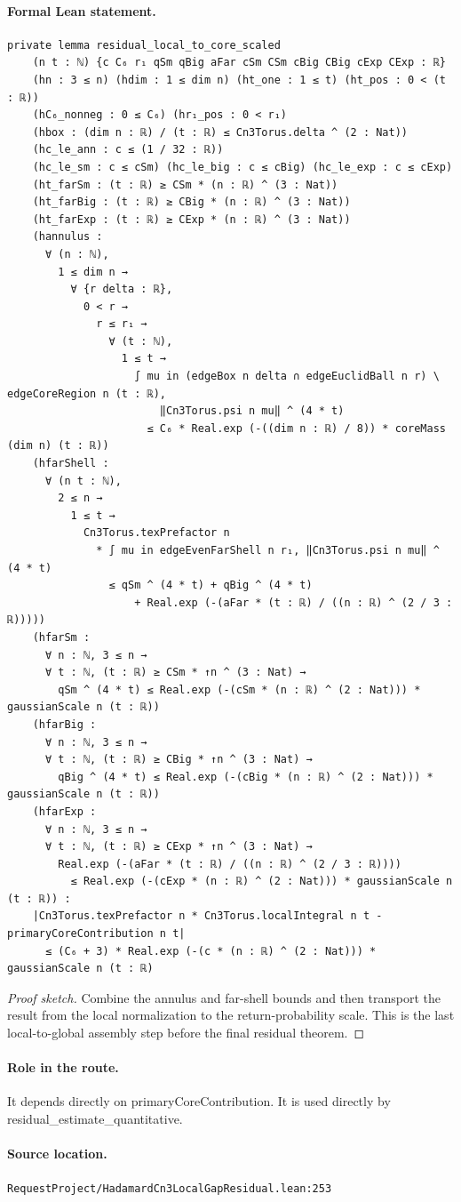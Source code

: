 \medskip
\paragraph{Formal Lean statement.}
\begin{verbatim}
private lemma residual_local_to_core_scaled
    (n t : ℕ) {c C₆ r₁ qSm qBig aFar cSm CSm cBig CBig cExp CExp : ℝ}
    (hn : 3 ≤ n) (hdim : 1 ≤ dim n) (ht_one : 1 ≤ t) (ht_pos : 0 < (t : ℝ))
    (hC₆_nonneg : 0 ≤ C₆) (hr₁_pos : 0 < r₁)
    (hbox : (dim n : ℝ) / (t : ℝ) ≤ Cn3Torus.delta ^ (2 : Nat))
    (hc_le_ann : c ≤ (1 / 32 : ℝ))
    (hc_le_sm : c ≤ cSm) (hc_le_big : c ≤ cBig) (hc_le_exp : c ≤ cExp)
    (ht_farSm : (t : ℝ) ≥ CSm * (n : ℝ) ^ (3 : Nat))
    (ht_farBig : (t : ℝ) ≥ CBig * (n : ℝ) ^ (3 : Nat))
    (ht_farExp : (t : ℝ) ≥ CExp * (n : ℝ) ^ (3 : Nat))
    (hannulus :
      ∀ (n : ℕ),
        1 ≤ dim n →
          ∀ {r delta : ℝ},
            0 < r →
              r ≤ r₁ →
                ∀ (t : ℕ),
                  1 ≤ t →
                    ∫ mu in (edgeBox n delta ∩ edgeEuclidBall n r) \ edgeCoreRegion n (t : ℝ),
                        ‖Cn3Torus.psi n mu‖ ^ (4 * t)
                      ≤ C₆ * Real.exp (-((dim n : ℝ) / 8)) * coreMass (dim n) (t : ℝ))
    (hfarShell :
      ∀ (n t : ℕ),
        2 ≤ n →
          1 ≤ t →
            Cn3Torus.texPrefactor n
              * ∫ mu in edgeEvenFarShell n r₁, ‖Cn3Torus.psi n mu‖ ^ (4 * t)
                ≤ qSm ^ (4 * t) + qBig ^ (4 * t)
                    + Real.exp (-(aFar * (t : ℝ) / ((n : ℝ) ^ (2 / 3 : ℝ)))))
    (hfarSm :
      ∀ n : ℕ, 3 ≤ n →
      ∀ t : ℕ, (t : ℝ) ≥ CSm * ↑n ^ (3 : Nat) →
        qSm ^ (4 * t) ≤ Real.exp (-(cSm * (n : ℝ) ^ (2 : Nat))) * gaussianScale n (t : ℝ))
    (hfarBig :
      ∀ n : ℕ, 3 ≤ n →
      ∀ t : ℕ, (t : ℝ) ≥ CBig * ↑n ^ (3 : Nat) →
        qBig ^ (4 * t) ≤ Real.exp (-(cBig * (n : ℝ) ^ (2 : Nat))) * gaussianScale n (t : ℝ))
    (hfarExp :
      ∀ n : ℕ, 3 ≤ n →
      ∀ t : ℕ, (t : ℝ) ≥ CExp * ↑n ^ (3 : Nat) →
        Real.exp (-(aFar * (t : ℝ) / ((n : ℝ) ^ (2 / 3 : ℝ))))
          ≤ Real.exp (-(cExp * (n : ℝ) ^ (2 : Nat))) * gaussianScale n (t : ℝ)) :
    |Cn3Torus.texPrefactor n * Cn3Torus.localIntegral n t - primaryCoreContribution n t|
      ≤ (C₆ + 3) * Real.exp (-(c * (n : ℝ) ^ (2 : Nat))) * gaussianScale n (t : ℝ)
\end{verbatim}
\begin{proof}[Proof sketch]
Combine the annulus and far-shell bounds and then transport the result from the local normalization to the return-probability scale. This is the last local-to-global assembly step before the final residual theorem.
\end{proof}
\paragraph{Role in the route.}
It depends directly on primaryCoreContribution. It is used directly by residual\_estimate\_quantitative.
\paragraph{Source location.}
\texttt{RequestProject/HadamardCn3LocalGapResidual.lean:253}
\medskip
